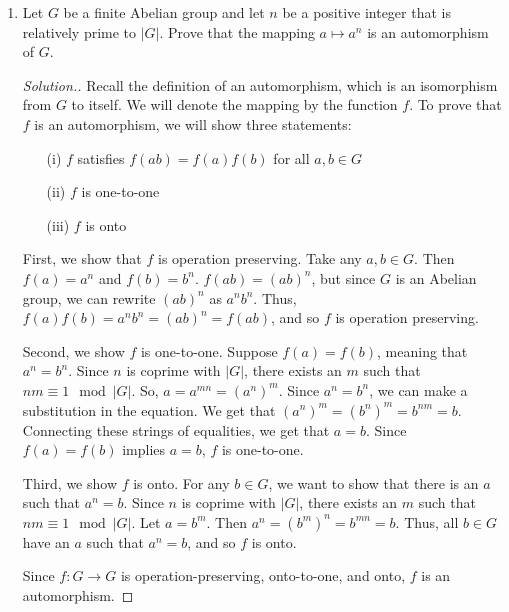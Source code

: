 \documentclass{article}
\newcommand{\sk}{\smallskip}
\begin{document}
\begin{enumerate}
    \item Let $G$ be a finite Abelian group and let $n$ be a positive integer that is relatively prime to $|G|$. Prove that the mapping $a \mapsto a^n$ is an automorphism of $G$.

    \begin{proof}[Solution.]
    Recall the definition of an automorphism, which is an isomorphism from $G$ to itself. We will denote the mapping by the function $f$. To prove that $f$ is an automorphism, we will show three statements:
        \begin{enumerate}
            \item[(i)] $f$ satisfies $f(ab) = f(a)f(b)$ for all $a, b \in G$
            \item[(ii)] $f$ is one-to-one
            \item[(iii)] $f$ is onto
        \end{enumerate}

    First, we show that $f$ is operation preserving. Take any $a, b \in G$. Then $f(a) = a^n$ and $f(b) = b^n$. $f(ab) = (ab)^n$, but since $G$ is an Abelian group, we can rewrite $(ab)^n$ as $a^nb^n$. Thus, $f(a)f(b) = a^nb^n = (ab)^n = f(ab)$, and so $f$ is operation preserving. 

    \sk 

    Second, we show $f$ is one-to-one. Suppose $f(a) = f(b)$, meaning that $a^n = b^n$. Since $n$ is coprime with $|G|$, there exists an $m$ such that $nm \equiv 1 \mod |G|$. So, $a = a^{mn} = (a^n)^m$. Since $a^n = b^n$, we can make a substitution in the equation. We get that $(a^n)^m = (b^n)^m = b^{nm} = b$. Connecting these strings of equalities, we get that $a = b$. Since $f(a) = f(b)$ implies $a = b$, $f$ is one-to-one. 

    \sk

    Third, we show $f$ is onto. For any $b \in G$, we want to show that there is an $a$ such that $a^n = b$. Since $n$ is coprime with $|G|$, there exists an $m$ such that $nm \equiv 1 \mod |G|$. Let $a = b^{m}$. Then $a^n = (b^{m})^n = b^{mn} = b$. Thus, all $b \in G$ have an $a$ such that $a^n = b$, and so $f$ is onto. 

    \sk

    Since $f: G \rightarrow G$ is operation-preserving, onto-to-one, and onto, $f$ is an automorphism.  
    
    \end{proof}
    


\end{enumerate}
\end{document}
